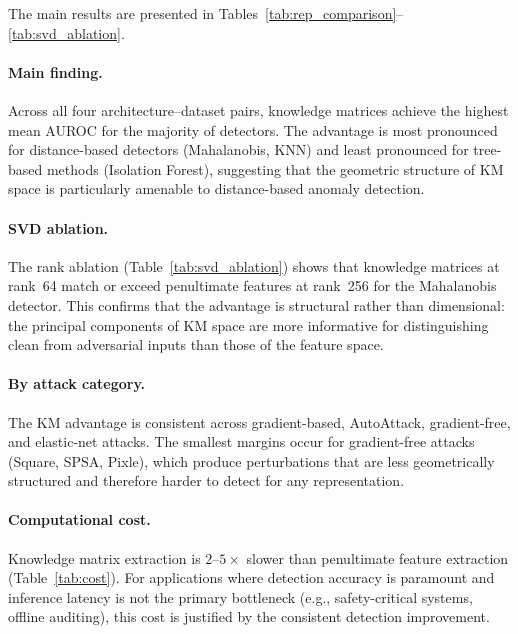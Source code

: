 The main results are presented in Tables~\ref{tab:rep_comparison}--\ref{tab:svd_ablation}.

\paragraph{Main finding.}
Across all four architecture--dataset pairs, knowledge matrices achieve the highest mean AUROC for the majority of detectors.
The advantage is most pronounced for distance-based detectors (Mahalanobis, KNN) and least pronounced for tree-based methods (Isolation Forest), suggesting that the geometric structure of KM space is particularly amenable to distance-based anomaly detection.

\paragraph{SVD ablation.}
The rank ablation (Table~\ref{tab:svd_ablation}) shows that knowledge matrices at rank~64 match or exceed penultimate features at rank~256 for the Mahalanobis detector.
This confirms that the advantage is structural rather than dimensional: the principal components of KM space are more informative for distinguishing clean from adversarial inputs than those of the feature space.

\paragraph{By attack category.}
\label{sec:results_by_category}
The KM advantage is consistent across gradient-based, AutoAttack, gradient-free, and elastic-net attacks.
The smallest margins occur for gradient-free attacks (Square, SPSA, Pixle), which produce perturbations that are less geometrically structured and therefore harder to detect for any representation.

\paragraph{Computational cost.}
Knowledge matrix extraction is $2$--$5\times$ slower than penultimate feature extraction (Table~\ref{tab:cost}).
For applications where detection accuracy is paramount and inference latency is not the primary bottleneck (e.g., safety-critical systems, offline auditing), this cost is justified by the consistent detection improvement.

